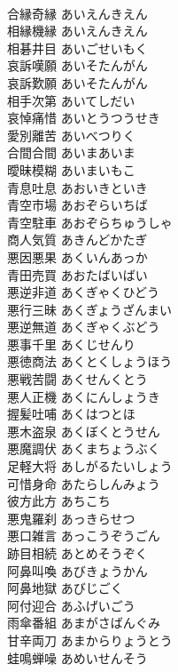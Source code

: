 \documentclass[8pt]{extreport}
\begin{document}
\begin{CJK}{UTF8}{min}
\\	合縁奇縁	あいえんきえん	
\\	相縁機縁	あいえんきえん	
\\	相碁井目	あいごせいもく	
\\	哀訴嘆願	あいそたんがん	
\\	哀訴歎願	あいそたんがん	
\\	相手次第	あいてしだい	
\\	哀悼痛惜	あいとうつうせき	
\\	愛別離苦	あいべつりく	
\\	合間合間	あいまあいま	
\\	曖昧模糊	あいまいもこ	
\\	青息吐息	あおいきといき	
\\	青空市場	あおぞらいちば	
\\	青空駐車	あおぞらちゅうしゃ	
\\	商人気質	あきんどかたぎ	
\\	悪因悪果	あくいんあっか	
\\	青田売買	あおたばいばい	
\\	悪逆非道	あくぎゃくひどう	
\\	悪行三昧	あくぎょうざんまい	
\\	悪逆無道	あくぎゃくぶどう	
\\	悪事千里	あくじせんり	
\\	悪徳商法	あくとくしょうほう	
\\	悪戦苦闘	あくせんくとう	
\\	悪人正機	あくにんしょうき	
\\	握髪吐哺	あくはつとほ	
\\	悪木盗泉	あくぼくとうせん	
\\	悪魔調伏	あくまちょうぶく	
\\	足軽大将	あしがるたいしょう	
\\	可惜身命	あたらしんみょう	
\\	彼方此方	あちこち	
\\	悪鬼羅刹	あっきらせつ	
\\	悪口雑言	あっこうぞうごん	
\\	跡目相続	あとめそうぞく	
\\	阿鼻叫喚	あびきょうかん	
\\	阿鼻地獄	あびじごく	
\\	阿付迎合	あふげいごう	
\\	雨傘番組	あまがさばんぐみ	
\\	甘辛両刀	あまからりょうとう	
\\	蛙鳴蝉噪	あめいせんそう	

\end{CJK}
\end{document}
